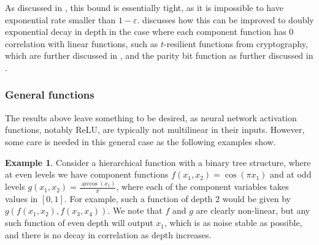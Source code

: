 \documentclass[12pt,letterpaper]{amsart}
\newcommand{\1}[1]{1_{\left\{#1\right\}}}
\theoremstyle{definition}
\newtheorem{example}[theorem]{Example}
\theoremstyle{remark}
\begin{document}
As discussed in , this bound is essentially tight, as it is impossible to have exponential rate smaller than $1-\varepsilon$.
 discusses how this can be improved to doubly exponential decay in depth in the case where each component function has $0$ correlation with linear functions, such as $t$-resilient functions from cryptography, which are further discussed in , and the parity bit function as further discussed in .
\subsubsection{General functions}
The results above leave something to be desired, as neural network activation functions, notably ReLU, are typically not multilinear in their inputs.
However, some care is needed in this general case as the following examples show.
\begin{example}\label{example:cos_arccos}
    Consider a hierarchical function with a binary tree structure, where at even levels we have component functions $f(x_1,x_2)=\cos(\pi x_1)$ and at odd levels $g(x_1,x_2)=\frac{\arccos(x_1)}{\pi}$, where each of the component variables takes values in $[0,1]$.
    For example, such a function of depth 2 would be given by $g(f(x_1,x_2),f(x_3,x_4))$.
    We note that $f$ and $g$ are clearly non-linear, but any such function of even depth will output $x_1$, which is as noise stable as possible, and there is no decay in correlation as depth increases.
\end{example}
\end{document}
